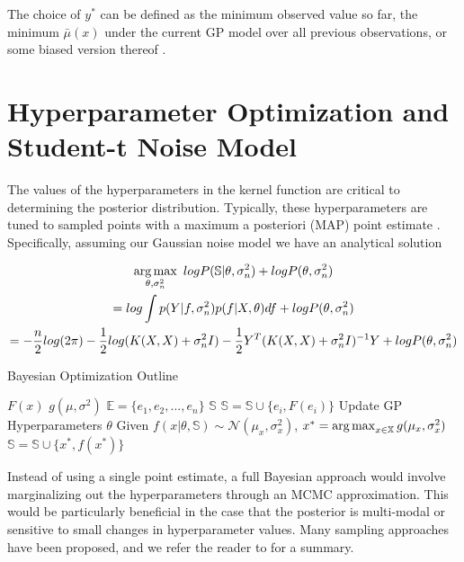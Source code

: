 The choice of $y^*$ can be defined as the minimum observed value so far, the minimum $\bar{\mu}(x)$ under the current GP model over all previous observations, or some biased version thereof \citep{Lizotte:2008:PBO:1626686}. 

\section{Hyperparameter Optimization and Student-t Noise Model}
\label{gp_hyperparam}
The values of the hyperparameters in the kernel function are critical to determining the posterior distribution. Typically, these hyperparameters are tuned to sampled points with a maximum a posteriori (MAP) point estimate \citep{NIPS2012_4522,GPstuff}. Specifically, assuming our Gaussian noise model we have an analytical solution

\begin{gather}
\operatorname*{arg\,max}_{\theta, \sigma_n^2} \text{ } log P(\mathbb{S}\vert \theta, \sigma_n^2) + log P(\theta, \sigma_n^2)\\
=log \int p(Y\vert f, \sigma_n^2)p(f\vert X,\theta)df + log P(\theta, \sigma_n^2)\nonumber\\
= -\frac{n}{2}log(2\pi) - \frac{1}{2}log(K(X,X) + \sigma_n^2 I) - \frac{1}{2}Y^T(K(X,X) + \sigma_n^2 I)^{-1}Y + log P(\theta, \sigma_n^2)\nonumber
\end{gather}


\begin{algorithm}[t]
\caption{Bayesian Optimization Outline}
\label{alg:bayesopt}
\begin{algorithmic}
\State {} $F(x)$
\State {} $g(\mu, \sigma^2)$
\State {} $\mathbb{E} = \{e_1, e_2, ..., e_n\}$
\State {} $\mathbb{S}$
  \State $\mathbb{S} = \mathbb{S} \cup \{e_i, F(e_i)\}$
\End
{}
  \State Update GP Hyperparameters $\theta$
  \State Given $f(x\vert \theta, \mathbb{S}) \sim \mathcal{N}(\mu_x, \sigma_x^2)$,
  \State $x^* = \operatorname*{arg\,max}_{x \in \mathbb{X}} g(\mu_x, \sigma_x^2)$
  \State $\mathbb{S} = \mathbb{S} \cup \{x^*, f(x^*)\}$
\End
\end{algorithmic}
\end{algorithm}


Instead of using a single point estimate, a full Bayesian approach would involve marginalizing out the hyperparameters through an MCMC approximation. This would be particularly beneficial in the case that the posterior is multi-modal or sensitive to small changes in hyperparameter values. Many sampling approaches have been proposed, and we refer the reader to \cite[Chapter~14]{barber2011bayesian} for a summary. 

